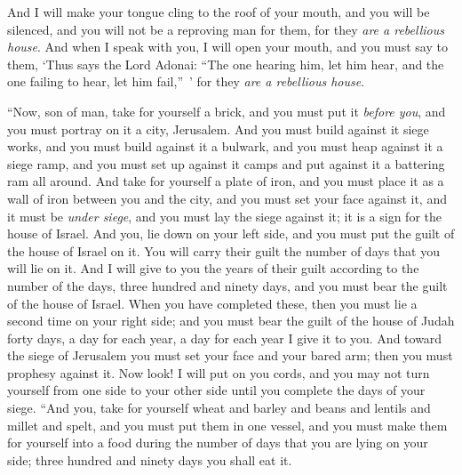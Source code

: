\begin{biblechapter}
\verse And I will make your tongue cling to the roof of your mouth, and you will be silenced, and you will not be a reproving man for them, for they \textit{are a rebellious house}.
\verse And when I speak with you, I will open your mouth, and you must say to them, ‘Thus says the Lord Adonai: “The one hearing him, let him hear, and the one failing to hear, let him fail,” ’ for they \textit{are a rebellious house}.
\end{biblechapter}

\begin{biblechapter} %
 “Now, son of man, take for yourself a brick, and you must put it \textit{before you}, and you must portray on it a city, Jerusalem.
\verse And you must build against it siege works, and you must build against it a bulwark, and you must heap against it a siege ramp, and you must set up against it camps and put against it a battering ram all around.
\verse And take for yourself a plate of iron, and you must place it as a wall of iron between you and the city, and you must set your face against it, and it must be \textit{under siege}, and you must lay the siege against it; it is a sign for the house of Israel.
\verse And you, lie down on your left side, and you must put the guilt of the house of Israel on it. You will carry their guilt the number of days that you will lie on it.
\verse And I will give to you the years of their guilt according to the number of the days, three hundred and ninety days, and you must bear the guilt of the house of Israel.
\verse When you have completed these, then you must lie a second time on your right side; and you must bear the guilt of the house of Judah forty days, a day for each year, a day for each year I give it to you.
\verse And toward the siege of Jerusalem you must set your face and your bared arm; then you must prophesy against it.
\verse Now look! I will put on you cords, and you may not turn yourself from one side to your other side until you complete the days of your siege.
 “And you, take for yourself wheat and barley and beans and lentils and millet and spelt, and you must put them in one vessel, and you must make them for yourself into a food during the number of days that you are lying on your side; three hundred and ninety days you shall eat it.

\end{biblechapter}
